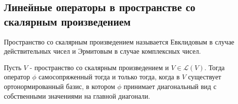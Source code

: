 
\subsection{Линейные операторы в пространстве со скалярным произведением}

\begin{reminder}
    Пространство со скалярным произведением называется Евклидовым в случае действительных чисел и Эрмитовым в случае комплексных чисел.
\end{reminder}

\begin{theorem}
    \label{th 13.1}
    Пусть $V$ - пространство со скалярным произведением и $V \in \mathcal{L}(V)$. Тогда оператор $\phi$ самосопряженный тогда и только тогда, когда в $V$ существует ортонормированный базис, в котором $\phi$ принимает диагональный вид с собственными значениями на главной диагонали. 
\end{theorem}

